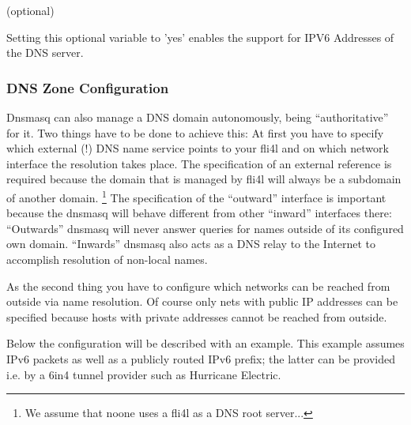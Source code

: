 \begin{description}
      (optional)

     {Setting this optional variable to 'yes' enables the support for IPV6
      Addresses of the DNS server.}

  \end{description}

\subsubsection{DNS Zone Configuration}

Dnsmasq can also manage a DNS domain autonomously, being ``authoritative''
for it. Two things have to be done to achieve this: At first you have to
specify which external (!) DNS name service points to your fli4l and on
which network interface the resolution takes place. The specification of an
external reference is required because the domain that is managed by fli4l
will always be a subdomain of another domain. \footnote{We assume that
noone uses a fli4l as a DNS root server...} The specification of
the ``outward'' interface is important because the dnsmasq will
behave different from other ``inward'' interfaces there: ``Outwards'' dnsmasq
will never answer queries for names outside of its configured
own domain. ``Inwards'' dnsmasq also acts as a DNS relay to
the Internet to accomplish resolution of non-local names.

As the second thing you have to configure which networks can
be reached from outside via name resolution. Of course only nets
with public IP addresses can be specified because hosts with private
addresses cannot be reached from outside.

Below the configuration will be described with an example. This
example assumes IPv6 packets as well as a publicly routed IPv6 prefix;
the latter can be provided i.e. by a 6in4 tunnel provider such as Hurricane
Electric.

